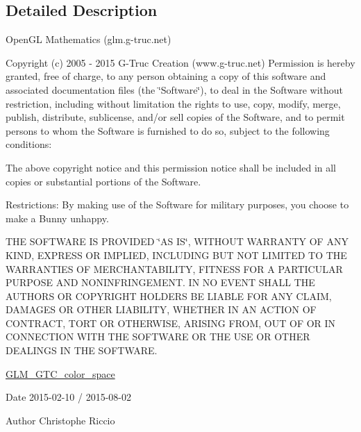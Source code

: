 \subsection{Detailed Description}
Open\+G\+L Mathematics (glm.\+g-\/truc.\+net)

Copyright (c) 2005 -\/ 2015 G-\/\+Truc Creation (www.\+g-\/truc.\+net) Permission is hereby granted, free of charge, to any person obtaining a copy of this software and associated documentation files (the \char`\"{}\+Software\char`\"{}), to deal in the Software without restriction, including without limitation the rights to use, copy, modify, merge, publish, distribute, sublicense, and/or sell copies of the Software, and to permit persons to whom the Software is furnished to do so, subject to the following conditions\+:

The above copyright notice and this permission notice shall be included in all copies or substantial portions of the Software.

Restrictions\+: By making use of the Software for military purposes, you choose to make a Bunny unhappy.

T\+H\+E S\+O\+F\+T\+W\+A\+R\+E I\+S P\+R\+O\+V\+I\+D\+E\+D \char`\"{}\+A\+S I\+S\char`\"{}, W\+I\+T\+H\+O\+U\+T W\+A\+R\+R\+A\+N\+T\+Y O\+F A\+N\+Y K\+I\+N\+D, E\+X\+P\+R\+E\+S\+S O\+R I\+M\+P\+L\+I\+E\+D, I\+N\+C\+L\+U\+D\+I\+N\+G B\+U\+T N\+O\+T L\+I\+M\+I\+T\+E\+D T\+O T\+H\+E W\+A\+R\+R\+A\+N\+T\+I\+E\+S O\+F M\+E\+R\+C\+H\+A\+N\+T\+A\+B\+I\+L\+I\+T\+Y, F\+I\+T\+N\+E\+S\+S F\+O\+R A P\+A\+R\+T\+I\+C\+U\+L\+A\+R P\+U\+R\+P\+O\+S\+E A\+N\+D N\+O\+N\+I\+N\+F\+R\+I\+N\+G\+E\+M\+E\+N\+T. I\+N N\+O E\+V\+E\+N\+T S\+H\+A\+L\+L T\+H\+E A\+U\+T\+H\+O\+R\+S O\+R C\+O\+P\+Y\+R\+I\+G\+H\+T H\+O\+L\+D\+E\+R\+S B\+E L\+I\+A\+B\+L\+E F\+O\+R A\+N\+Y C\+L\+A\+I\+M, D\+A\+M\+A\+G\+E\+S O\+R O\+T\+H\+E\+R L\+I\+A\+B\+I\+L\+I\+T\+Y, W\+H\+E\+T\+H\+E\+R I\+N A\+N A\+C\+T\+I\+O\+N O\+F C\+O\+N\+T\+R\+A\+C\+T, T\+O\+R\+T O\+R O\+T\+H\+E\+R\+W\+I\+S\+E, A\+R\+I\+S\+I\+N\+G F\+R\+O\+M, O\+U\+T O\+F O\+R I\+N C\+O\+N\+N\+E\+C\+T\+I\+O\+N W\+I\+T\+H T\+H\+E S\+O\+F\+T\+W\+A\+R\+E O\+R T\+H\+E U\+S\+E O\+R O\+T\+H\+E\+R D\+E\+A\+L\+I\+N\+G\+S I\+N T\+H\+E S\+O\+F\+T\+W\+A\+R\+E.

\hyperlink{group__gtc__color__space}{G\+L\+M\+\_\+\+G\+T\+C\+\_\+color\+\_\+space}

\begin{DoxyDate}{Date}
2015-\/02-\/10 / 2015-\/08-\/02 
\end{DoxyDate}
\begin{DoxyAuthor}{Author}
Christophe Riccio 
\end{DoxyAuthor}
